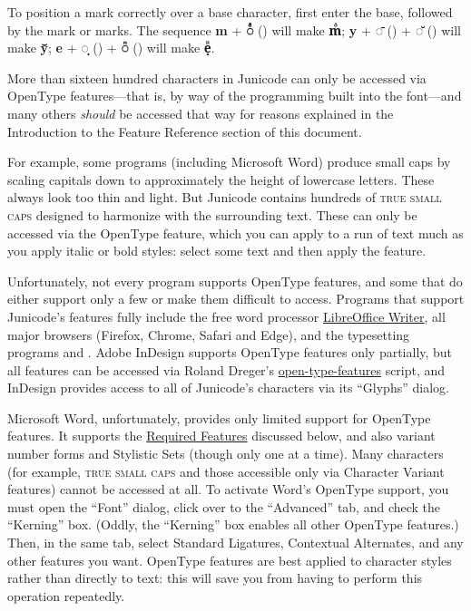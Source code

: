 To position a mark correctly over a base character, first enter the base,
followed by the mark or marks.
The sequence \textbf{m} + \textbf{◌ᷙ} ()
will make \textbf{mᷙ}; \textbf{y} + \textbf{◌̄} () + \textbf{◌̆} () will make \textbf{ȳ̆};
\textbf{e} + \textbf{◌̣} () + \textbf{◌ᷠ} () will make \textbf{ẹᷠ}.

More than sixteen hundred characters in Junicode can only be accessed via OpenType features—that is,
by way of the programming built into the font—and many others \textit{should} be
accessed that way for reasons explained in the Introduction
to the Feature Reference section of this document.

For example, some programs (including Microsoft Word) produce small caps by
scaling capitals down to approximately the height of lowercase letters.
These always look too thin and light.
But Junicode contains hundreds of \textsc{true small caps} designed to harmonize with
the surrounding text. These can only be accessed via the OpenType  feature,
which you can apply to a run of text much as you apply italic or bold styles:
select some text and then apply the feature.

Unfortunately, not every program supports OpenType features, and some that do
either support only a few or make them difficult to access. Programs
that support Junicode’s features fully include the free word processor
\href{https://www.libreoffice.org/}{LibreOffice Writer}, all major browsers
(Firefox, Chrome, Safari and Edge), and
the typesetting programs {\LuaLaTeX} and {\XeLaTeX}. Adobe InDesign supports
OpenType features only partially, but all features can be accessed via
Roland Dreger’s \href{https://github.com/RolandDreger/open-type-features}{open-type-features}
script, and InDesign provides access to
all of Junicode's characters via its “Glyphs” dialog.

Microsoft Word, unfortunately, provides only limited support for OpenType
features. It supports the \hyperlink{req}{Required Features} discussed below, and also
variant number forms and Stylistic Sets (though only one at a time). Many characters
(for example, \textsc{true small caps} and those accessible only via Character
Variant features) cannot be accessed at all. To activate Word's OpenType
support, you must open the “Font” dialog, click over to the “Advanced” tab,
and check the “Kerning” box. (Oddly, the “Kerning” box enables all other
OpenType features.) Then, in the same tab, select Standard Ligatures, Contextual
Alternates, and any other features you want.
OpenType features are best applied to character styles rather than
directly to text: this will
save you from having to perform this operation repeatedly.

